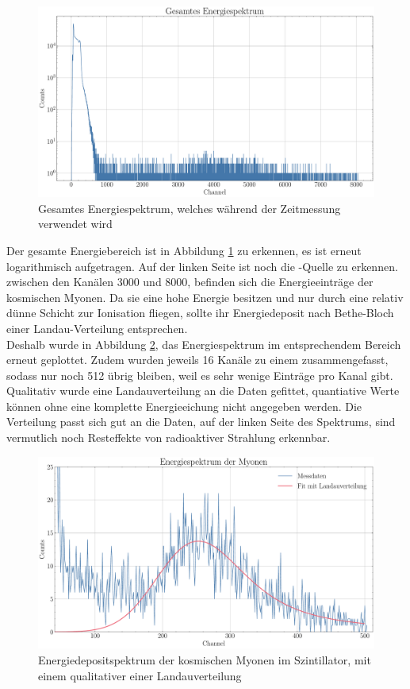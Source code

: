 \documentclass[12pt,a4paper,ngerman]{report}
\begin{document}
	\begin{figure}[ht]
		\centering
		\includegraphics[width=\textwidth]{Bilder/gesamterEnBereich.pdf}		
		\caption{Gesamtes Energiespektrum, welches während der Zeitmessung verwendet wird}
		\label{img:gesamterEnBereich}
	\end{figure}
	Der gesamte Energiebereich ist in Abbildung \ref{img:gesamterEnBereich} zu erkennen, es ist erneut logarithmisch aufgetragen. Auf der linken Seite ist noch die -Quelle zu erkennen. zwischen den Kanälen 3000 und 8000, befinden sich die Energieeinträge der kosmischen Myonen. Da sie eine hohe Energie besitzen und nur durch eine relativ dünne Schicht zur Ionisation fliegen, sollte ihr Energiedeposit nach Bethe-Bloch einer Landau-Verteilung entsprechen.\\
	Deshalb wurde in Abbildung \ref{img:MyonenLandau}, das Energiespektrum im entsprechendem Bereich erneut geplottet. Zudem wurden jeweils 16 Kanäle zu einem zusammengefasst, sodass nur noch 512 übrig bleiben, weil es sehr wenige Einträge pro Kanal gibt. Qualitativ wurde eine Landauverteilung an die Daten gefittet, quantiative Werte können ohne eine komplette Energieeichung nicht angegeben werden. Die Verteilung passt sich gut an die Daten, auf der linken Seite des Spektrums, sind vermutlich noch Resteffekte von radioaktiver Strahlung erkennbar. 
	\begin{figure}[ht]
		\centering
		\includegraphics[width=\textwidth]{Bilder/MyonenLandau.pdf}		
		\caption{Energiedepositspektrum der kosmischen Myonen im Szintillator, mit einem qualitativer einer Landauverteilung}
		\label{img:MyonenLandau}
	\end{figure}
\end{document}
